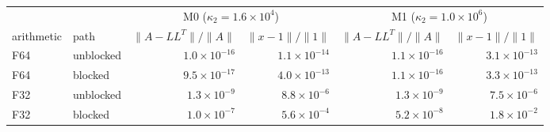\begin{tabular}{llrrrr}
\toprule
 & & \multicolumn{2}{c}{M0 ($\kappa_2=1.6\times10^{4}$)} & \multicolumn{2}{c}{M1 ($\kappa_2=1.0\times10^{6}$)}\\
arithmetic & path & $\|A-LL^T\|/\|A\|$ & $\|x-1\|/\|1\|$ & $\|A-LL^T\|/\|A\|$ & $\|x-1\|/\|1\|$\\
\midrule
F64 & unblocked & $1.0\!\times\!10^{-16}$ & $1.1\!\times\!10^{-14}$ & $1.1\!\times\!10^{-16}$ & $3.1\!\times\!10^{-13}$\\
F64 & blocked & $9.5\!\times\!10^{-17}$ & $4.0\!\times\!10^{-13}$ & $1.1\!\times\!10^{-16}$ & $3.3\!\times\!10^{-13}$\\
F32 & unblocked & $1.3\!\times\!10^{-9}$ & $8.8\!\times\!10^{-6}$ & $1.3\!\times\!10^{-9}$ & $7.5\!\times\!10^{-6}$\\
F32 & blocked & $1.0\!\times\!10^{-7}$ & $5.6\!\times\!10^{-4}$ & $5.2\!\times\!10^{-8}$ & $1.8\!\times\!10^{-2}$\\
\bottomrule
\end{tabular}
